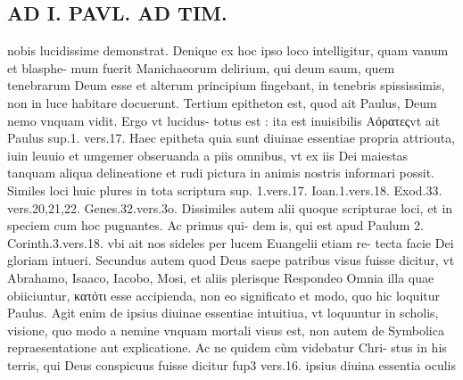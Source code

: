 \documentclass{article}
\begin{document}
\begin{pages}
\section*{AD I. PAVL. AD TIM. }
\marginpar{[ p.450 ]}\pstart nobis lucidissime demonstrat. Denique ex hoc ipso loco intelligitur, quam vanum et blasphe- mum fuerit Manichaeorum delirium, qui deum saum, quem tenebrarum Deum esse et alterum principium fingebant, in tenebris spississimis, non in luce habitare docuerunt.  \pend\pstart Tertium epitheton est, quod ait Paulus, Deum nemo vnquam vidit. Ergo vt lucidus- totus est : ita est inuisibilis Αόρατεςvt ait Paulus sup.1. vers.17. Haec epitheta quia sunt diuinae essentiae propria attriouta, iuin leuuio et umgemer obseruanda a piis omnibus, vt ex iis Dei maiestas tanquam aliqua delineatione et rudi pictura in animis nostris informari possit.  \pend\pstart Similes loci huic plures in tota scriptura sup. 1.vers.17. Ioan.1.vers.18. Exod.33. vers.20,21,22. Genes.32.vers.3o.  \pend\pstart Dissimiles autem alii quoque scripturae loci, et in speciem cum hoc pugnantes. Ac primus qui- dem is, qui est apud Paulum 2. Corinth.3.vers.18. vbi ait nos sideles per lucem Euangelii etiam re- tecta facie Dei gloriam intueri. Secundus autem quod Deus saepe patribus visus fuisse dicitur, vt Abrahamo, Isaaco, Iacobo, Mosi, et aliis plerisque  Respondeo Omnia illa quae obiiciuntur, κατότι esse accipienda, non eo significato et modo, quo hic loquitur Paulus. Agit enim de ipsius diuinae essentiae intuitiua, vt loquuntur in scholis, visione, quo modo a nemine vnquam mortali visus est, non autem de Symbolica repraesentatione aut explicatione. Ac ne quidem cùm videbatur Chri- stus in his terris, qui Deus conspicuus fuisse dicitur fup3 vers.16. ipsius diuina essentia oculis  \pend

\end{pages}
\end{document}
